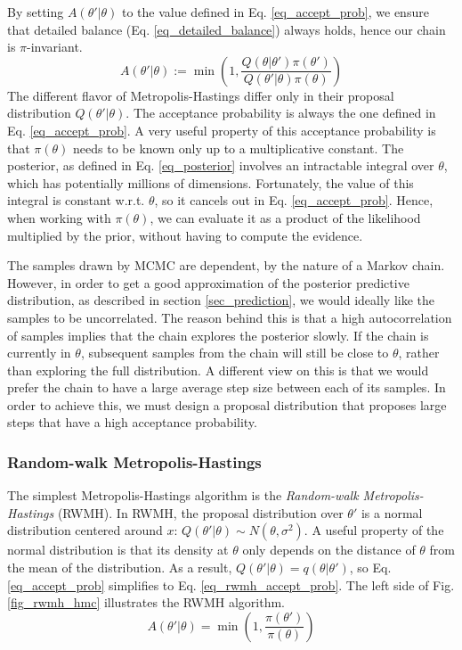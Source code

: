 \documentclass[12pt]{article}
\begin{document}
By setting $A(\theta'|\theta)$ to the value defined in Eq. \ref{eq_accept_prob}, we ensure that detailed balance (Eq. \ref{eq_detailed_balance}) always holds, hence our chain is $\pi$-invariant. 
$$
A(\theta'|\theta) := \min \left(1, \frac{Q(\theta|\theta')\pi(\theta')}{Q(\theta'|\theta)\pi(\theta)} \right)
\label{eq_accept_prob}
$$
The different flavor of Metropolis-Hastings differ only in their proposal distribution $Q(\theta'|\theta)$. The acceptance probability is always the one defined in Eq. \ref{eq_accept_prob}. A very useful property of this acceptance probability is that $\pi(\theta)$ needs to be known only up to a multiplicative constant. The posterior, as defined in Eq. \ref{eq_posterior} involves an intractable integral over $\theta$, which has potentially millions of dimensions. Fortunately, the value of this integral is constant w.r.t. $\theta$, so it cancels out in Eq. \ref{eq_accept_prob}. Hence, when working with $\pi(\theta)$, we can evaluate it as a product of the likelihood multiplied by the prior, without having to compute the evidence.

The samples drawn by MCMC are dependent, by the nature of a Markov chain. However, in order to get a good approximation of the posterior predictive distribution, as described in section \ref{sec_prediction}, we would ideally like the samples to be uncorrelated. The reason behind this is that a high autocorrelation of samples implies that the chain explores the posterior slowly. If the chain is currently in $\theta$, subsequent samples from the chain will still be close to $\theta$, rather than exploring the full distribution. A different view on this is that we would prefer the chain to have a large average step size between each of its samples. In order to achieve this, we must design a proposal distribution that proposes large steps that have a high acceptance probability.

\subsubsection{Random-walk Metropolis-Hastings}

The simplest Metropolis-Hastings algorithm is the \textit{Random-walk Metropolis-Hastings} (RWMH). In RWMH, the proposal distribution over $\theta'$ is a normal distribution centered around $x$: $Q(\theta'|\theta) \sim N(\theta, \sigma^2)$. A useful property of the normal distribution is that its density at $\theta$ only depends on the distance of $\theta$ from the mean of the distribution. As a result, $Q(\theta'|\theta) = q(\theta|\theta')$, so Eq. \ref{eq_accept_prob} simplifies to Eq. \ref{eq_rwmh_accept_prob}. The left side of Fig. \ref{fig_rwmh_hmc} illustrates the RWMH algorithm.
$$
A(\theta'|\theta) = \min \left(1, \frac{\pi(\theta')}{\pi(\theta)} \right)
$$
\end{document}
